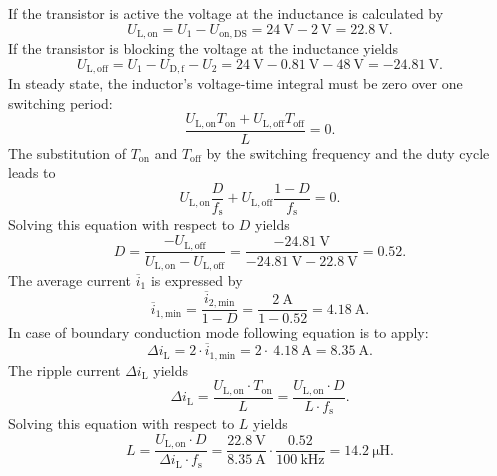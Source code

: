 \begin{solutionblock}
	If the transistor is active the voltage at the inductance is calculated by
	\begin{equation*}
		U_\mathrm{L,on}=U_\mathrm{1}- U_{\mathrm{on},\mathrm{DS}} = \SI{24}{\volt} - \SI{2}{\volt} = \SI{22.8}{\volt}.
		\label{eq:voltage_ratio}
	\end{equation*}
	If the transistor is blocking the voltage at the inductance yields
	\begin{equation*}
		U_\mathrm{L,off}= U_\mathrm{1} - U_{\mathrm{D},\mathrm{f}} - U_\mathrm{2} = \SI{24}{\volt} - \SI{0.81}{\volt} - \SI{48}{\volt} = -\SI{24.81}{\volt}.
		\label{eq:voltage_ratio}
	\end{equation*}
	In steady state, the inductor's voltage-time integral must be zero over one switching period:
	\begin{equation*}
		\frac{U_\mathrm{L,on} T_\mathrm{on} + U_\mathrm{L,off} T_\mathrm{off}}{L} = 0.
		\label{eq:voltage_ratio}
	\end{equation*}
	The substitution of $T_\mathrm{on}$ and $T_\mathrm{off}$ by the switching frequency and the duty cycle leads to
	\begin{equation*}
		U_\mathrm{L,on} \frac{D} {f_\mathrm{s}} + U_\mathrm{L,off} \frac{1-D} {f_\mathrm{s}} = 0.
		\label{eq:voltage_ratio}
	\end{equation*}
	Solving this equation with respect to $D$ yields
	\begin{equation*}
		D=\frac{-U_\mathrm{L,off}}{U_\mathrm{L,on}-U_\mathrm{L,off}}=\frac{-\SI{24.81}{\volt}}{-\SI{24.81}{\volt}-\SI{22.8}{\volt}}=0.52.
		\label{eq:dutycycle}
	\end{equation*}
	The average current $\overline{i}_\mathrm{1}$ is expressed by
	\begin{equation*}
		\overline{i}_\mathrm{1,min} = \frac {\overline{i}_\mathrm{2,min}}{1-D}= \frac {\SI{2}{\ampere}}{1-0.52}=\SI{4.18}{\ampere}.
	\end{equation*}
	In case of boundary conduction mode following equation is to apply:
	\begin{equation*}
		\Delta i_\mathrm{L}= 2 \cdot \overline{i}_\mathrm{1,min} = 2 \cdot\ \SI{4.18}{\ampere} = \SI{8.35}{\ampere}.
	\end{equation*}
	The ripple current $\Delta i_\mathrm{L}$ yields
	\begin{equation*}
		\Delta i_\mathrm{L}=\frac{U_\mathrm{L,on} \cdot T_\mathrm{on}}{L} =\frac{U_\mathrm{L,on} \cdot D}{L \cdot f_\mathrm{s}}.
	\end{equation*}
	Solving this equation with respect to $L$ yields
	\begin{equation*}
		L= \frac{U_\mathrm{L,on} \cdot D}{\Delta i_\mathrm{L} \cdot f_\mathrm{s}} = \frac{\SI{22.8}{\volt}}{\SI{8.35}{\ampere}} \cdot \frac{0.52}{\SI{100}{\kilo\hertz}} = \SI{14.2}{\micro\henry}.
	\end{equation*}
\end{solutionblock}

